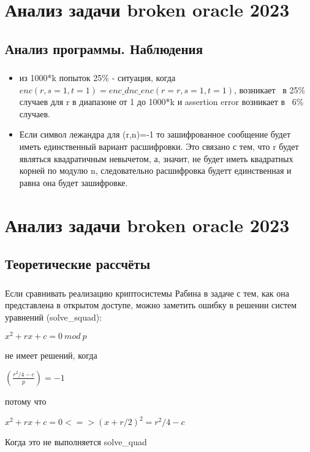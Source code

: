 \documentclass[t]{beamer}
\begin{document}
\section{Анализ задачи broken oracle 2023}
\subsection{Анализ программы. Наблюдения}
\begin{frame}
	\frametitle{\insertsection}
	\framesubtitle{\insertsubsection}
    \begin{itemize}
        \item из 1000*k попыток 25\% - ситуация, когда $enc(r,s=1,t=1)=enc\_dnc\_enc(r=r,s=1,t=1)$, возникает ~в 25\% случаев для r в диапазоне от 1 до 1000*k и assertion error возникает в ~6\% случаев.
        \item Если символ лежандра для (r,n)=-1 то зашифрованное сообщение будет иметь единственный вариант расшифровки. Это связано с тем, что r будет являться квадратичным невычетом, а, значит, не будет иметь квадратных корней по модулю n, следовательно расшифровка будетт единственная и равна она будет зашифровке.
    \end{itemize}
\end{frame}

\section{Анализ задачи broken oracle 2023}
\subsection{Теоретические рассчёты}
\begin{frame}[t] %
	\frametitle{\insertsection}
	\framesubtitle{\insertsubsection}
            Если сравнивать реализацию криптосистемы Рабина в задаче с тем, как она представлена в открытом доступе, можно заметить ошибку в решении систем уравнений (solve\_squad):
        \begin{center}
            $x^2+rx+c=0\ mod\ p$
        \end{center}
            не имеет решений, когда
        \begin{center}
            $\left( \frac{r^2/4-c}{p}\right)=-1$
        \end{center}
            потому что
        \begin{center}
        $x^2+rx+c=0<=>(x+r/2)^2=r^2/4-c$
        \end{center}
            Когда это не выполняется solve\_quad 
\end{frame}
\end{document}

